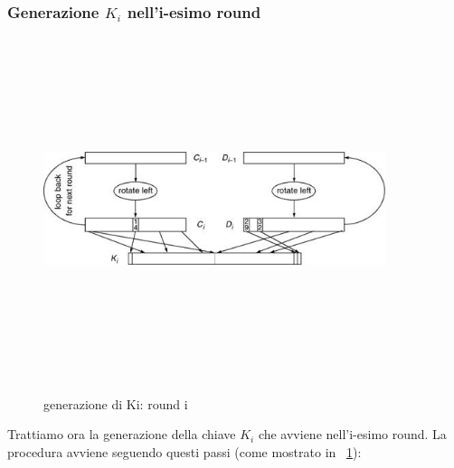 \subsubsection{Generazione $K_{i}$ nell'i-esimo round}
\begin{figure}[htbp]
	\centering%
	\subfigure%
	{\includegraphics[height=10cm, width=10cm, keepaspectratio]{Immagini/chiave_segreta/round_i.png}}
	\caption{generazione di Ki: round i \label{fig:round_i}} 	
\end{figure}
Trattiamo ora la generazione della chiave $K_{i}$ che avviene nell'i-esimo round. La procedura avviene seguendo questi passi (come mostrato in \figurename ~\ref{fig:round_i}):
